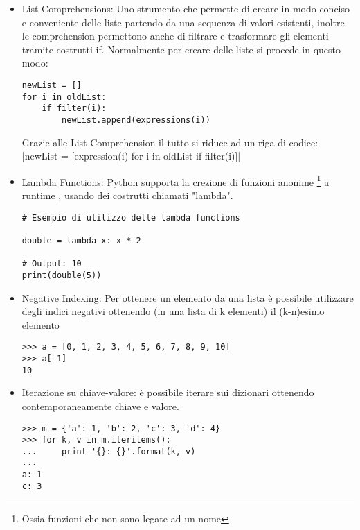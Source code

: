 \begin{itemize}
\item List Comprehensions: Uno strumento che permette di creare in modo conciso e conveniente delle liste partendo da una sequenza di valori esistenti, inoltre le comprehension permettono anche di filtrare e trasformare gli elementi tramite costrutti if.
Normalmente per creare delle liste si procede in questo modo:
\begin{listing}[H]
\begin{verbatim}
newList = []
for i in oldList:
    if filter(i):
        newList.append(expressions(i))
\end{verbatim}
\end{listing}

Grazie alle List Comprehension il tutto si riduce ad un riga di codice:
|newList = [expression(i) for i in oldList if filter(i)]|

\item Lambda Functions: Python supporta la crezione di funzioni anonime \footnote{Ossia funzioni che non sono legate ad un nome} a runtime , usando dei costrutti chiamati "lambda".  
\begin{listing}[H]
\begin{verbatim}
# Esempio di utilizzo delle lambda functions

double = lambda x: x * 2

# Output: 10
print(double(5))
\end{verbatim}
\end{listing}
\item Negative Indexing: Per ottenere un elemento da una lista è possibile utilizzare degli indici negativi ottenendo (in una lista di k elementi) il (k-n)esimo elemento
\begin{listing}[H]
\begin{verbatim}
>>> a = [0, 1, 2, 3, 4, 5, 6, 7, 8, 9, 10]
>>> a[-1]
10
\end{verbatim}
\end{listing}
\item Iterazione su chiave-valore: è possibile iterare sui dizionari ottenendo contemporaneamente chiave e valore.
\begin{listing}[H]
\begin{verbatim}
>>> m = {'a': 1, 'b': 2, 'c': 3, 'd': 4}
>>> for k, v in m.iteritems():
...     print '{}: {}'.format(k, v)
...
a: 1
c: 3
\end{verbatim}
\end{listing}


\end{itemize}


